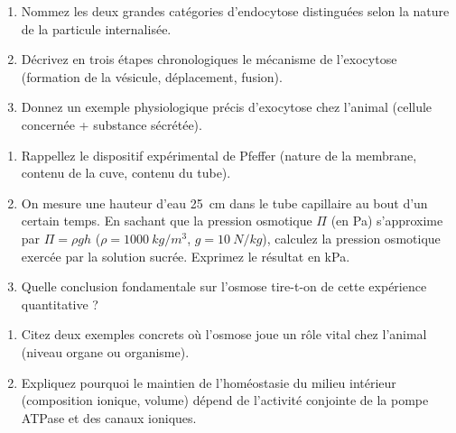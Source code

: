 \documentclass[11pt]{article}
\begin{document}
\begin{exercice}
\begin{enumerate}
    \item Nommez les deux grandes catégories d'endocytose distinguées selon la nature de la particule internalisée.
    \item Décrivez en trois étapes chronologiques le mécanisme de l'exocytose (formation de la vésicule, déplacement, fusion).
    \item Donnez un exemple physiologique précis d'exocytose chez l'animal (cellule concernée + substance sécrétée).
\end{enumerate}
\end{exercice}

\begin{exercice}
\begin{enumerate}
    \item Rappellez le dispositif expérimental de Pfeffer (nature de la membrane, contenu de la cuve, contenu du tube).
    \item On mesure une hauteur d'eau \SI{25}{cm} dans le tube capillaire au bout d'un certain temps. En sachant que la pression osmotique $\Pi$ (en Pa) s'approxime par $\Pi = \rho g h$ ($\rho = \SI{1000}{kg/m^3}$, $g = \SI{10}{N/kg}$), calculez la pression osmotique exercée par la solution sucrée. Exprimez le résultat en kPa.
    \item Quelle conclusion fondamentale sur l'osmose tire-t-on de cette expérience quantitative ?
\end{enumerate}
\end{exercice}

\begin{exercice}
\begin{enumerate}
    \item Citez deux exemples concrets où l'osmose joue un rôle vital chez l'animal (niveau organe ou organisme).
    \item Expliquez pourquoi le maintien de l'homéostasie du milieu intérieur (composition ionique, volume) dépend de l'activité conjointe de la pompe  ATPase et des canaux ioniques.
\end{enumerate}
\end{exercice}
\end{document}
